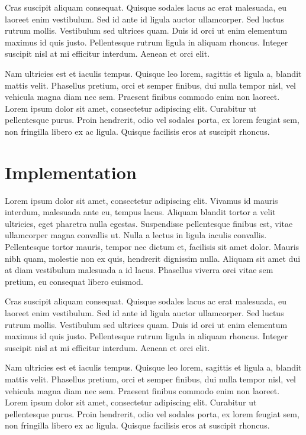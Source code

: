 \documentclass[a4paper, nobind]{templates/ociamthesis}
\theoremstyle{definition}
\theoremstyle{definition}
\theoremstyle{definition}
\theoremstyle{remark}
\begin{document}
Cras suscipit aliquam consequat. Quisque sodales lacus ac erat malesuada, eu laoreet enim vestibulum. Sed id ante id ligula auctor ullamcorper. Sed luctus rutrum mollis. Vestibulum sed ultrices quam. Duis id orci ut enim elementum maximus id quis justo. Pellentesque rutrum ligula in aliquam rhoncus. Integer suscipit nisl at mi efficitur interdum. Aenean et orci elit.

Nam ultricies est et iaculis tempus. Quisque leo lorem, sagittis et ligula a, blandit mattis velit. Phasellus pretium, orci et semper finibus, dui nulla tempor nisl, vel vehicula magna diam nec sem. Praesent finibus commodo enim non laoreet. Lorem ipsum dolor sit amet, consectetur adipiscing elit. Curabitur ut pellentesque purus. Proin hendrerit, odio vel sodales porta, ex lorem feugiat sem, non fringilla libero ex ac ligula. Quisque facilisis eros at suscipit rhoncus.

\hypertarget{implementation}{%
\section{Implementation}\label{implementation}}

Lorem ipsum dolor sit amet, consectetur adipiscing elit. Vivamus id mauris interdum, malesuada ante eu, tempus lacus. Aliquam blandit tortor a velit ultricies, eget pharetra nulla egestas. Suspendisse pellentesque finibus est, vitae ullamcorper magna convallis ut. Nulla a lectus in ligula iaculis convallis. Pellentesque tortor mauris, tempor nec dictum et, facilisis sit amet dolor. Mauris nibh quam, molestie non ex quis, hendrerit dignissim nulla. Aliquam sit amet dui at diam vestibulum malesuada a id lacus. Phasellus viverra orci vitae sem pretium, eu consequat libero euismod.

Cras suscipit aliquam consequat. Quisque sodales lacus ac erat malesuada, eu laoreet enim vestibulum. Sed id ante id ligula auctor ullamcorper. Sed luctus rutrum mollis. Vestibulum sed ultrices quam. Duis id orci ut enim elementum maximus id quis justo. Pellentesque rutrum ligula in aliquam rhoncus. Integer suscipit nisl at mi efficitur interdum. Aenean et orci elit.

Nam ultricies est et iaculis tempus. Quisque leo lorem, sagittis et ligula a, blandit mattis velit. Phasellus pretium, orci et semper finibus, dui nulla tempor nisl, vel vehicula magna diam nec sem. Praesent finibus commodo enim non laoreet. Lorem ipsum dolor sit amet, consectetur adipiscing elit. Curabitur ut pellentesque purus. Proin hendrerit, odio vel sodales porta, ex lorem feugiat sem, non fringilla libero ex ac ligula. Quisque facilisis eros at suscipit rhoncus.
\end{document}
